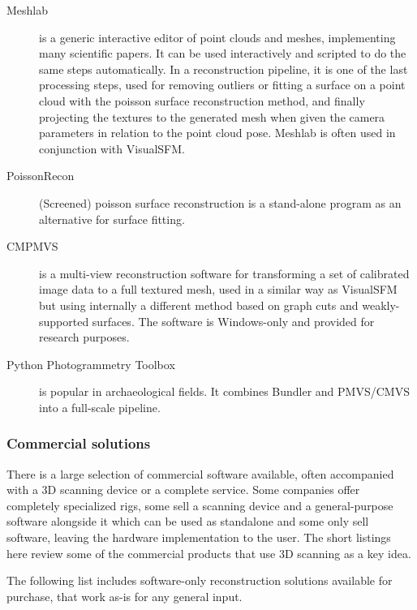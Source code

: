 \begin{description}
	\item[Meshlab] \cite{meshlab} is a generic interactive editor of point clouds and meshes, implementing many scientific papers.
		It can be used interactively and scripted to do the same steps automatically.
		In a reconstruction pipeline, it is one of the last processing steps, used for removing outliers or fitting a surface on a point cloud with the poisson surface reconstruction method, and finally projecting the textures to the generated mesh when given the camera parameters in relation to the point cloud pose.
		Meshlab is often used in conjunction with VisualSFM.

	\item[PoissonRecon] \cite{kazhdan2013screened} (Screened) poisson surface reconstruction is a stand-alone program as an alternative for surface fitting.

	\item[CMPMVS] \cite{jancosek2011multi} is a multi-view reconstruction software for transforming a set of calibrated image data to a full textured mesh, used in a similar way as VisualSFM but using internally a different method based on graph cuts and weakly-supported surfaces.
		The software is Windows-only and provided for research purposes.

	\item[Python Photogrammetry Toolbox] \cite{moulon2011python} is popular in archaeological fields.
		It combines Bundler and PMVS/CMVS into a full-scale pipeline.
\end{description}



\subsubsection{Commercial solutions} %

There is a large selection of commercial software available, often accompanied with a 3D scanning device or a complete service.
Some companies offer completely specialized rigs, some sell a scanning device and a general-purpose software alongside it which can be used as standalone and some only sell software, leaving the hardware implementation to the user.
The short listings here review some of the commercial products that use 3D scanning as a key idea.

The following list includes software-only reconstruction solutions available for purchase, that work as-is for any general input.

